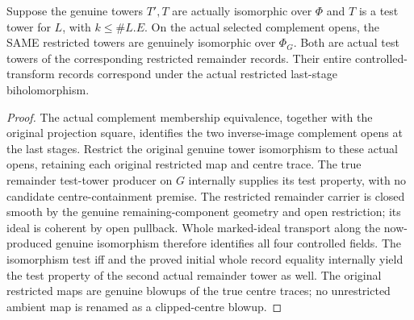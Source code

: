 \begin{theorem}
\label{hir:zero-contact-tail-actual-iso-calculus}
\leanok
{}
Suppose the genuine towers $T',T$ are actually isomorphic over $\Phi$ and
$T$ is a test tower for $L$, with $k\leq\#L.E$. On the actual selected
complement opens, the SAME restricted towers are genuinely isomorphic over
$\Phi_G$. Both are actual test towers of the corresponding restricted
remainder records. Their entire controlled-transform records correspond
under the actual restricted last-stage biholomorphism.
\end{theorem}
\begin{proof}
The actual complement membership equivalence, together with the original
projection square, identifies the two inverse-image complement opens at the
last stages. Restrict the original genuine tower isomorphism to these actual
opens, retaining each original restricted map and centre trace.
The true remainder test-tower producer on $G$ internally supplies its test
property, with no candidate centre-containment premise. The restricted
remainder carrier is closed smooth by the genuine remaining-component
geometry and open restriction; its ideal is coherent by open pullback.
Whole marked-ideal transport along the now-produced genuine isomorphism
therefore identifies all four controlled fields. The isomorphism test iff
and the proved initial whole record equality internally yield the test
property of the second actual remainder tower as well. The original
restricted maps are genuine blowups of the true centre traces; no
unrestricted ambient map is renamed as a clipped-centre blowup.
\end{proof}

